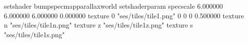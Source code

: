 setshader bumpspecmapparallaxworld
setshaderparam specscale 6.000000 6.000000 6.000000 0.000000
texture 0 "ses/tiles/tile1.png" 0 0 0 0.500000
texture n "ses/tiles/tile1n.png"
texture z "ses/tiles/tile1z.png"
texture s "ses/tiles/tile1s.png"

